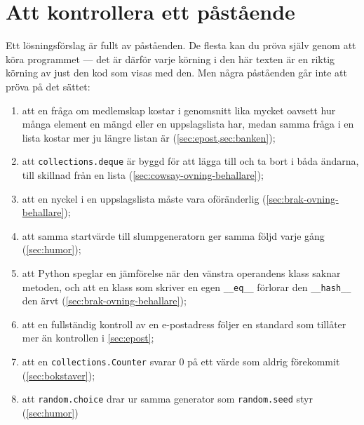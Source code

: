 
\chapter{Att kontrollera ett påstående}
\label{app:verifiera-ovning-behallare}

Ett lösningsförslag är fullt av påståenden.  De flesta kan du pröva
själv genom att köra programmet --- det är därför varje körning i den
här texten är en riktig körning av just den kod som visas med den.  Men
några påståenden går inte att pröva på det sättet:
\begin{enumerate}
  \item att en fråga om medlemskap kostar i genomsnitt lika mycket
    oavsett hur många element en mängd eller en uppslagslista har, medan
    samma fråga i en lista kostar mer ju längre listan är
    (\cref{sec:epost,sec:banken});
  \item att \texttt{collections.deque} är byggd för att
    lägga till och ta bort i båda ändarna, till skillnad från en lista
    (\cref{sec:cowsay-ovning-behallare});
  \item att en nyckel i en uppslagslista måste vara oföränderlig
    (\cref{sec:brak-ovning-behallare});
  \item att samma startvärde till slumpgeneratorn ger samma följd varje
    gång (\cref{sec:humor});
  \item att Python speglar en jämförelse när den vänstra operandens
    klass saknar metoden, och att en klass som skriver en egen
    \texttt{__eq__} förlorar den \texttt{__hash__}
    den ärvt (\cref{sec:brak-ovning-behallare});
  \item att en fullständig kontroll av en e-postadress följer en standard
    som tillåter mer än kontrollen i \cref{sec:epost};
  \item att en \texttt{collections.Counter} svarar \(0\) på
    ett värde som aldrig förekommit (\cref{sec:bokstaver});
  \item att \texttt{random.choice} drar ur samma generator
    som \texttt{random.seed} styr (\cref{sec:humor})%
\end{enumerate}
